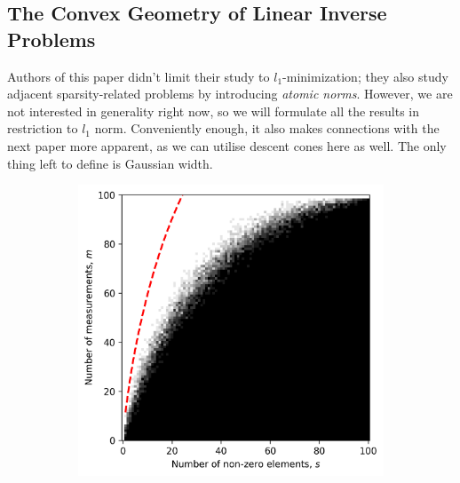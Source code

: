 \subsection{The Convex Geometry of Linear Inverse Problems}

Authors of this paper didn't limit their study to $l_1$-minimization; they also study adjacent sparsity-related problems
by introducing \textit{atomic norms}.
However, we are not interested in generality right now, so we will formulate all the results in restriction to $l_1$ norm.
Conveniently enough, it also makes connections with the next paper more apparent, as we can utilise descent cones here as well.
The only thing left to define is Gaussian width.

\begin{figure}
    \begin{subfigure}{0.5\linewidth}
        \includegraphics[width=\linewidth]{pictures/log_estimate.png}
        \caption{}
    \end{subfigure}
    \begin{subfigure}{0.5\linewidth}

\end{subfigure}
\end{figure}
